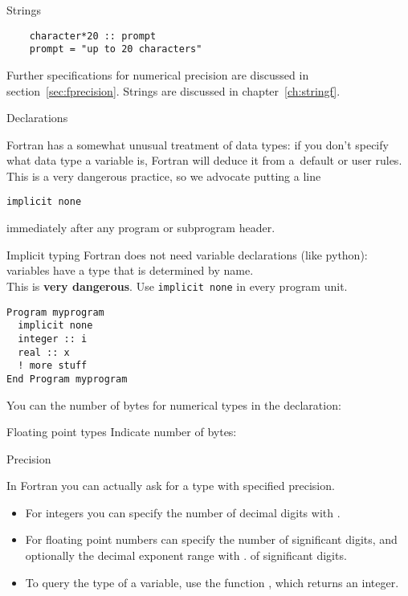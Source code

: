 \begin{slide}{Strings}
  \label{sl:fchar20}
  \begin{lstlisting}
    character*20 :: prompt
    prompt = "up to 20 characters"
  \end{lstlisting}
\end{slide}

Further specifications for numerical
    precision are discussed in section~\ref{sec:fprecision}.
Strings are discussed in chapter~\ref{ch:stringf}.

 {Declarations}
\label{sec:ftype}

Fortran has a somewhat unusual treatment of data types: if you don't
specify what data type a variable is, Fortran will deduce it from
a~default or user rules. This is a very dangerous practice, so we
advocate putting a line
\begin{lstlisting}
implicit none
\end{lstlisting}
immediately after any program or subprogram header.

\begin{slide}{Implicit typing}
  \label{sl:fimplicit}
  Fortran does not need variable declarations (like python):\\
  variables have a type that is determined by name.\\
  This is \textbf{very dangerous}. Use \lstinline{implicit none}
  in every program unit.
\begin{lstlisting}
Program myprogram
  implicit none
  integer :: i
  real :: x
  ! more stuff
End Program myprogram
\end{lstlisting}
\end{slide}

You can the number of bytes for numerical types in the declaration:
%

\begin{slide}{Floating point types}
  \label{sl:ffloat}
  Indicate number of bytes:
\end{slide}

 {Precision}
\label{sec:fprecision}

In Fortran you can actually ask for a type with specified precision.
\begin{itemize}
\item For integers you can specify the number of decimal digits with
  .
\item For floating point numbers can specify the number of
  significant digits, and optionally the decimal exponent range with
  .
  of significant digits.
\item To query the type of a variable, use the function
  , which returns an integer.
\end{itemize}

